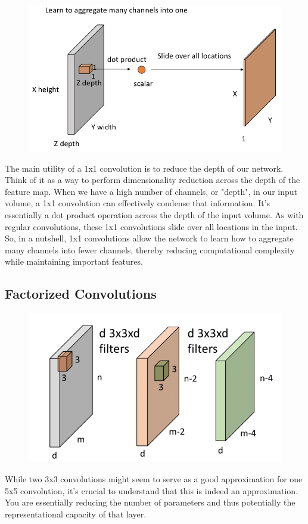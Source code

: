 \documentclass[11pt]{article}
\begin{document}
\begin{figure}[H]
    \centering
    \includegraphics[width=.6\linewidth]{figures/reduction.png}
\end{figure}

The main utility of a 1x1 convolution is to reduce the depth of our network. Think of it as a way to perform dimensionality reduction across the depth of the feature map. When we have a high number of channels, or "depth", in our input volume, a 1x1 convolution can effectively condense that information. It's essentially a dot product operation across the depth of the input volume. As with regular convolutions, these 1x1 convolutions slide over all locations in the input. So, in a nutshell, 1x1 convolutions allow the network to learn how to aggregate many channels into fewer channels, thereby reducing computational complexity while maintaining important features.

\subsection{Factorized Convolutions}

\begin{figure}[H]
    \centering
    \includegraphics[width=.6\linewidth]{figures/factorized-convolutions.png}
\end{figure}

While two 3x3 convolutions might seem to serve as a good approximation for one 5x5 convolution, it's crucial to understand that this is indeed an approximation. You are essentially reducing the number of parameters and thus potentially the representational capacity of that layer. 
\end{document}
